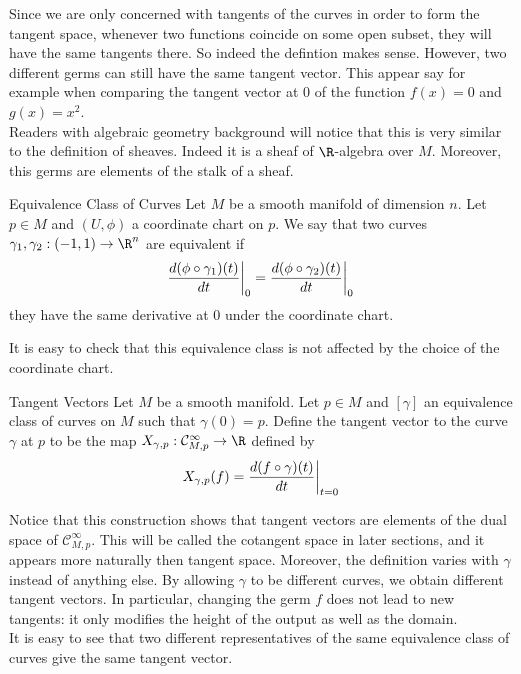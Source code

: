 \documentclass[a4paper]{article}
\begin{document}
Since we are only concerned with tangents of the curves in order to form the tangent space, whenever two functions coincide on some open subset, they will have the same tangents there. So indeed the defintion makes sense. However, two different germs can still have the same tangent vector. This appear say for example when comparing the tangent vector at $0$ of the function $f(x)=0$ and $g(x)=x^2$. \\

Readers with algebraic geometry background will notice that this is very similar to the definition of sheaves. Indeed it is a sheaf of $\R$-algebra over $M$. Moreover, this germs are elements of the stalk of a sheaf. 

\begin{defn}{Equivalence Class of Curves}{} Let $M$ be a smooth manifold of dimension $n$. Let $p\in M$ and $(U,\phi)$ a coordinate chart on $p$. We say that two curves $\gamma_1,\gamma_2:(-1,1)\to\R^n$ are equivalent if $$\frac{d(\phi\circ\gamma_1)(t)}{dt}\bigg{|}_0=\frac{d(\phi\circ\gamma_2)(t)}{dt}\bigg{|}_0$$ they have the same derivative at $0$ under the coordinate chart. 
\end{defn}

It is easy to check that this equivalence class is not affected by the choice of the coordinate chart. 

\begin{defn}{Tangent Vectors}{} Let $M$ be a smooth manifold. Let $p\in M$ and $[\gamma]$ an equivalence class of curves on $M$ such that $\gamma(0)=p$. Define the tangent vector to the curve $\gamma$ at $p$ to be the map $X_{\gamma,p}:\mathcal{C}_{M,p}^\infty\to\R$ defined by $$X_{\gamma,p}(f)=\frac{d(f\circ\gamma)(t)}{dt}\bigg{|}_{t=0}$$
\end{defn}

Notice that this construction shows that tangent vectors are elements of the dual space of $\mathcal{C}_{M,p}^\infty$. This will be called the cotangent space in later sections, and it appears more naturally then tangent space. Moreover, the definition varies with $\gamma$ instead of anything else. By allowing $\gamma$ to be different curves, we obtain different tangent vectors. In particular, changing the germ $f$ does not lead to new tangents: it only modifies the height of the output as well as the domain. \\

It is easy to see that two different representatives of the same equivalence class of curves give the same tangent vector. \\
\end{document}
